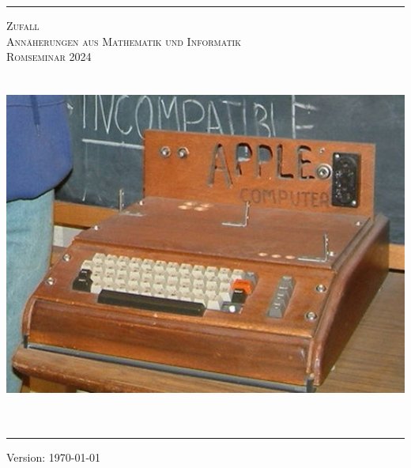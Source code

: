 \begin{titlepage}
%
\newcommand{\HRule}{\rule{\linewidth}{.25mm}}
\HRule
\vspace*{10pt}
\begin{center}
	{\scshape {\Huge Zufall} \\[0.5em]
	{\Large Annäherungen aus Mathematik und Informatik} \\[5mm]
	{\large Romseminar 2024} \\ }
	\vspace*{15pt}
	\includegraphics[width=14cm, height=12cm, keepaspectratio=true]{./content/Gruppenbild}
	\vspace*{10pt}	  
\end{center}
%
\HRule
{}
\begin{center}
	  {Version: \today }
\end{center}
\end{titlepage}

